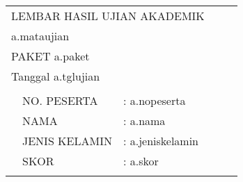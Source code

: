 \documentclass[12pt]{article}
\begin{document}
\thispagestyle{fancy}


\def\arraystretch{1.3}
\begin{table}[]
\centering
\begin{tabular}{llllm{11cm}l}

\multicolumn{5}{l}{\centerline{LEMBAR HASIL UJIAN AKADEMIK}   }       \\

\multicolumn{5}{l}{\centerline{a.mataujian}}                      \\

\multicolumn{5}{l}{\centerline{PAKET a.paket}}                           \\ \hline
\multicolumn{5}{l}{Tanggal a.tglujian}                        \\
\multicolumn{5}{l}{}                        \\
      & NO. PESERTA       & :  a.nopeserta    & 
\multicolumn{2}{l}{} \\
      & NAMA              & : a.nama    & 
\multicolumn{2}{l}{} \\
      & JENIS KELAMIN     & :  a.jeniskelamin   & 
\multicolumn{2}{l}{} \\
      & SKOR              & :  a.skor   & 
\multicolumn{2}{l}{} \\
      &                   &       &           &         
\end{tabular}
\end{table}
\def\arraystretch{1.5}
\end{document}
